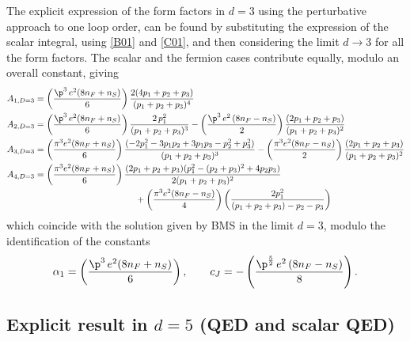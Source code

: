 \documentclass[a4paper,11pt,openright,twoside]{book}
\let\a=\alpha   \let\b=\beta   \let\g=\gamma   \let\d=\delta
\numberwithin{equation}{section}
\begin{document}
{{The explicit expression of the form factors in $d=3$ using the perturbative approach to one loop order, can be found by substituting the expression of the scalar integral, using \eqref{B01} and \eqref{C01}, and then considering the limit $d\to3$ for all the form factors. The scalar and the fermion cases contribute equally, modulo an overall constant, giving 
\begin{align}
	A_{1,D=3}&=\left(\frac{\p^3\,e^2(8n_F+n_S)}{6}\right)\frac{2(4p_1+p_2+p_3)}{(p_1+p_2+p_3)^4}\\
	A_{2,D=3}&=\left(\frac{\p^3\,e^2(8n_F+n_S)}{6}\right)\frac{2\,p_1^2}{(p_1+p_2+p_3)^3}-\left(\frac{\p^3\,e^2\,(8n_F-n_S)}{2}\right)\frac{(2p_1+p_2+p_3)}{(p_1+p_2+p_3)^2}\\
	A_{3,D=3}&=\left(\frac{\pi ^3 e^2 (8 n_F+n_S)}{6} \right)\frac{(-2 p_1^2-3 p_1 p_2+3 p_1 p_3-p_2^2+p_3^2)}{(p_1+p_2+p_3)^3}-\left(\frac{\pi ^3 e^2 (8 n_F-n_S) }{2}\right)\frac{(2 p_1+p_2+p_3)}{ (p_1+p_2+p_3)^2}\\
	A_{4,D=3}&=\left(\frac{\pi ^3 e^2 (8 n_F+n_S)}{6}\right)\frac{ (2 p_1+p_2+p_3) (p_1^2-(p_2+p_3)^2+4 p_2 p_3)}{2(p_1+p_2+p_3)^2}\notag\\
	&\hspace{4cm}+\left(\frac{\pi ^3 e^2 (8 n_F-n_S) }{4}\right)\left(\frac{2p_1^2}{ (p_1+p_2+p_3)-p_2-p_3}\right)
\end{align}
which coincide with the solution given by BMS in the limit $d=3$, modulo the identification of the constants
\begin{equation}
	\a_1=\left(\frac{\p^3\,e^2(8n_F+n_S)}{6}\right),\qquad c_J=-\left(\frac{\p^\frac{5}{2}\,e^2\,(8n_F-n_S)}{8}\right).
\end{equation}
\subsection{Explicit result in $d=5$ (QED and scalar QED)}

}}
\end{document}
